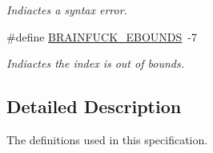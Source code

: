\begin{DoxyCompactItemize}
\begin{DoxyCompactList}\small\item\em Indiactes a syntax error. \end{DoxyCompactList}\item 
\hypertarget{group__definitions_gad3a715fcc0eaa30a461f6ca3d9508b8b}{}\#define \hyperlink{group__definitions_gad3a715fcc0eaa30a461f6ca3d9508b8b}{B\+R\+A\+I\+N\+F\+U\+C\+K\+\_\+\+E\+B\+O\+U\+N\+D\+S}~-\/7\label{group__definitions_gad3a715fcc0eaa30a461f6ca3d9508b8b}

\begin{DoxyCompactList}\small\item\em Indiactes the index is out of bounds. \end{DoxyCompactList}\end{DoxyCompactItemize}


\subsection{Detailed Description}
The definitions used in this specification. 

